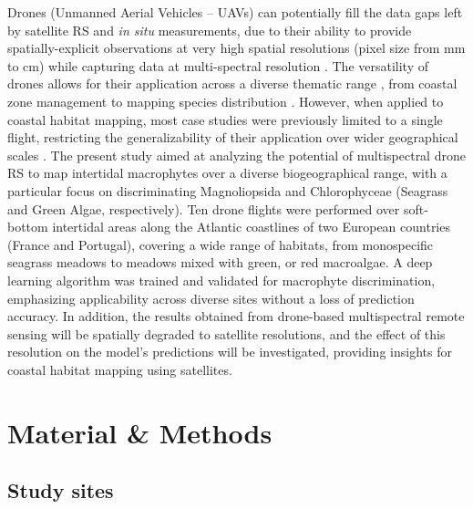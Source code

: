 \documentclass[
  number]{elsarticle}
\begin{document}
Drones (Unmanned Aerial Vehicles -- UAVs) can potentially fill the data
gaps left by satellite RS and \emph{in situ} measurements, due to their
ability to provide spatially-explicit observations at very high spatial
resolutions (pixel size from mm to cm) while capturing data at
multi-spectral resolution \citetext{\citealp[
]{fairley2022drone}; \citealp{oh2017use}}. The versatility of drones
allows for their application across a diverse thematic range , from
coastal zone management \citetext{\citealp[ ]{adade2021}; \citealp[
]{casella2020}; \citealp{angnuureng2022}} to mapping species
distribution \citetext{\citealp[ ]{joyce2023}; \citealp[
]{tallam2023}; \citealp[ ]{Roca2022}; \citealp[ ]{Roman2021}; \citealp[
]{Brunier2022Topographic}; \citealp{sousa2019blue}}. However, when
applied to coastal habitat mapping, most case studies were previously
limited to a single flight, restricting the generalizability of their
application over wider geographical scales \citetext{\citealp[
]{Roman2021}; \citealp[ ]{collin2019improving}; \citealp[
]{rossiter2020uav}; \citealp{Brunier2022Topographic}}. The present study
aimed at analyzing the potential of multispectral drone RS to map
intertidal macrophytes over a diverse biogeographical range, with a
particular focus on discriminating Magnoliopsida and Chlorophyceae
(Seagrass and Green Algae, respectively). Ten drone flights were
performed over soft-bottom intertidal areas along the Atlantic
coastlines of two European countries (France and Portugal), covering a
wide range of habitats, from monospecific seagrass meadows to meadows
mixed with green, or red macroalgae. A deep learning algorithm was
trained and validated for macrophyte discrimination, emphasizing
applicability across diverse sites without a loss of prediction
accuracy. In addition, the results obtained from drone-based
multispectral remote sensing will be spatially degraded to satellite
resolutions, and the effect of this resolution on the model's
predictions will be investigated, providing insights for coastal habitat
mapping using satellites.

\section{Material \& Methods}\label{material-methods}

\subsection{Study sites}\label{study-sites}
\end{document}
